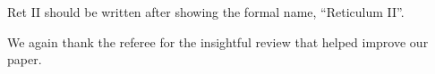 \documentclass[11pt]{article}
\begin{document}
\begin{tcolorbox}[colback={lightgray}] 
Ret II should be written after showing the formal name, “Reticulum II”.
\end{tcolorbox} 

We again thank the referee for the insightful review that helped improve our paper.



\end{document}
